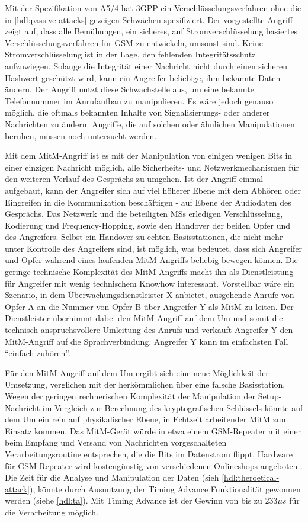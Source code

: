 Mit der Spezifikation von A5/4 hat \ac{3GPP} ein Verschlüsselungsverfahren ohne die in \autoref{hdl:passive-attacks} gezeigen Schwächen spezifiziert. Der vorgestellte Angriff zeigt auf, dass alle Bemühungen, ein sicheres, auf Stromverschlüsselung basiertes  Verschlüsselungsverfahren für \ac{GSM} zu entwickeln, umsonst sind. Keine Stromverschlüsselung ist in der Lage, den fehlenden Integritätsschutz aufzuwiegen. Solange die Integrität einer Nachricht nicht durch einen sicheren Hashwert geschützt wird, kann ein Angreifer beliebige, ihm bekannte Daten ändern. Der Angriff nutzt diese Schwachstelle aus, um eine bekannte Telefonnummer im Anrufaufbau zu manipulieren. Es wäre jedoch genauso möglich, die oftmals bekannten Inhalte von Signalisierungs- oder anderer Nachrichten zu ändern. Angriffe, die auf solchen oder ähnlichen Manipulationen beruhen, müssen noch untersucht werden.

Mit dem \ac{MitM}-Angriff ist es mit der Manipulation von einigen wenigen Bits in einer einzigen Nachricht möglich, alle Sicherheits- und Netzwerkmechanismen für den weiteren Verlauf des Gesprächs zu umgehen. Ist der Angriff einmal aufgebaut, kann der Angreifer sich auf viel höherer Ebene mit dem Abhören oder Eingreifen in die Kommunikation beschäftigen - auf Ebene der Audiodaten des Gesprächs. Das Netzwerk und die beteiligten \acp{MS} erledigen Verschlüsselung, Kodierung und Frequency-Hopping, sowie den Handover der beiden Opfer und des Angreifers. Selbst ein Handover zu echten Basisstationen, die nicht mehr unter Kontrolle des Angreifers sind, ist möglich, was bedeutet, dass sich Angreifer und Opfer während eines laufenden \ac{MitM}-Angriffs beliebig bewegen können. Die geringe technische Komplexität des \ac{MitM}-Angriffs macht ihn als Dienstleistung für Angreifer mit wenig technischem Knowhow interessant. Vorstellbar wäre ein Szenario, in dem Überwachungsdienstleister X anbietet, ausgehende Anrufe von Opfer A an die Nummer von Opfer B über Angreifer Y als \ac{MitM} zu leiten. Der Dienstleister übernimmt dabei den \ac{MitM}-Angriff auf dem \ac{Um} und somit die technisch anspruchsvollere Umleitung des Anrufs und verkauft Angreifer Y den \ac{MitM}-Angriff auf die Sprachverbindung. Angreifer Y kann im einfachsten Fall "`einfach zuhören"'.

Für den \ac{MitM}-Angriff auf dem \ac{Um} ergibt sich eine neue Möglichkeit der Umsetzung, verglichen mit der herkömmlichen über eine falsche Basisstation. Wegen der geringen rechnerischen Komplexität der Manipulation der Setup-Nachricht im Vergleich zur Berechnung des kryptografischen Schlüssels könnte auf dem \ac{Um} ein rein auf physikalischer Ebene, in Echtzeit arbeitender \ac{MitM} zum Einsatz kommen. Das \ac{MitM}-Gerät würde in etwa einem \ac{GSM}-Repeater mit einer beim Empfang und Versand von Nachrichten vorgeschalteten Verarbeitungsroutine entsprechen, die die Bits im Datenstrom flippt. Hardware für \ac{GSM}-Repeater wird kostengünstig von verschiedenen Onlineshops angeboten \citep{teltarif:gsm-repeater}. Die Zeit für die Analyse und Manipulation der Daten (sieh \autoref{hdl:theroetical-attack}), könnte durch Ausnutzung der Timing Advance Funktionalität gewonnen werden (siehe \autoref{hdl:ta}). Mit Timing Advance ist der Gewinn von bis zu $233 \mu s$ für die Verarbeitung möglich.

